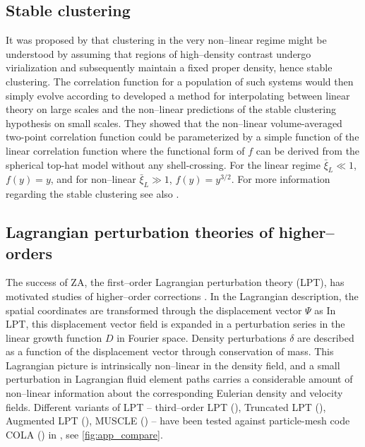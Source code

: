 \subsection{Stable clustering}
It was proposed by \textcite{1974ApJ...189L..51P} that clustering in the very non--linear regime might be understood by assuming that regions of high--density contrast undergo virialization and subsequently maintain a fixed proper density, hence stable clustering. The correlation function for a population of such systems would then simply evolve according to
\textcite{1991ApJ...374L...1H} developed a method for interpolating between linear theory on large scales and the non--linear predictions of the stable clustering hypothesis on small scales. They showed that the non--linear volume-averaged two-point correlation function could be parameterized by a simple function of the linear correlation function
where the functional form of $f$ can be derived from the spherical top-hat model without any shell-crossing. For the linear regime $\bar\xi_{L}\ll1$, $f(y)=y$, and for non--linear $\bar\xi_{L}\gg1$, $f(y)=y^{3/2}$. For more information regarding the stable clustering see  also \textcite{1996MNRAS.280L..19P,2003MNRAS.341.1311S}.
\subsection{Lagrangian perturbation theories of higher--orders}
The success of ZA, the first--order Lagrangian perturbation theory (LPT), has motivated studies of higher--order corrections \parencite[see e.g.][]{10.1093/mnras/264.2.375,2002PhR...367....1B,2010MNRAS.403.1859J,2014ApJ...788...63S}. In the Lagrangian description, the spatial coordinates are transformed through the displacement vector $\Psi$ as
In LPT, this displacement vector field is expanded in a perturbation series in the linear growth function $D$ in Fourier space. Density perturbations $\delta$ are described as a function of the displacement vector through conservation of mass. This Lagrangian picture is intrinsically non--linear in the density field, and a small perturbation in Lagrangian fluid element paths carries a considerable amount of non--linear information about the corresponding Eulerian density and velocity fields. Different variants of LPT -- third--order LPT (\cite{10.1093/mnras/264.2.375}), Truncated LPT (\cite{10.1093/mnras/260.4.765}), Augmented LPT (\cite{10.1093/mnrasl/slt101}), MUSCLE (\cite{10.1093/mnrasl/slv141}) -- have been tested against particle-mesh code COLA (\cite{2013JCAP...06..036T}) in \cite{2017JCAP...07..050M}, see \autoref{fig:app_compare}.

